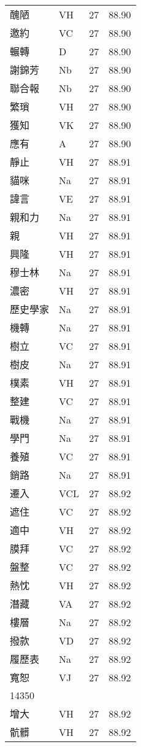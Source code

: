 \documentclass[twocolumn]{book}
\begin{document}
\begin{supertabular}{llrr}
醜陋 & VH & 27 &  88.90\\
邀約 & VC & 27 &  88.90\\
輾轉 & D & 27 &  88.90\\
謝錦芳 & Nb & 27 &  88.90\\
聯合報 & Nb & 27 &  88.90\\
繁瑣 & VH & 27 &  88.90\\
獲知 & VK & 27 &  88.90\\
應有 & A & 27 &  88.90\\
靜止 & VH & 27 &  88.91\\
貓咪 & Na & 27 &  88.91\\
諱言 & VE & 27 &  88.91\\
親和力 & Na & 27 &  88.91\\
親 & VH & 27 &  88.91\\
興隆 & VH & 27 &  88.91\\
穆士林 & Na & 27 &  88.91\\
濃密 & VH & 27 &  88.91\\
歷史學家 & Na & 27 &  88.91\\
機轉 & Na & 27 &  88.91\\
樹立 & VC & 27 &  88.91\\
樹皮 & Na & 27 &  88.91\\
樸素 & VH & 27 &  88.91\\
整建 & VC & 27 &  88.91\\
戰機 & Na & 27 &  88.91\\
學門 & Na & 27 &  88.91\\
養殖 & VC & 27 &  88.91\\
銷路 & Na & 27 &  88.91\\
遷入 & VCL & 27 &  88.92\\
遮住 & VC & 27 &  88.92\\
適中 & VH & 27 &  88.92\\
膜拜 & VC & 27 &  88.92\\
盤整 & VC & 27 &  88.92\\
熱忱 & VH & 27 &  88.92\\
潛藏 & VA & 27 &  88.92\\
樓層 & Na & 27 &  88.92\\
撥款 & VD & 27 &  88.92\\
履歷表 & Na & 27 &  88.92\\
寬恕 & VJ & 27 &  88.92\\
14350\\
增大 & VH & 27 &  88.92\\
骯髒 & VH & 27 &  88.92\\

\end{supertabular}
\end{document}
